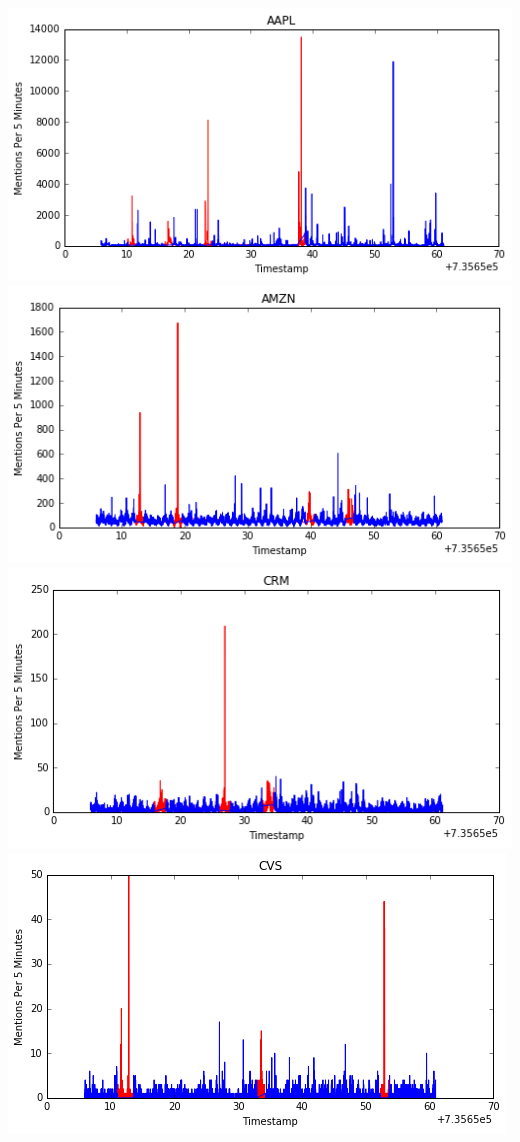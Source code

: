 \documentclass[11pt, margin=1in]{article}
\begin{document}
\begin{center}
\includegraphics[scale=0.4]{img/aapl.png}
\includegraphics[scale=0.4]{img/amzn.png}
\includegraphics[scale=0.4]{img/crm.png}
\includegraphics[scale=0.4]{img/cvs.png}

\end{center}
\end{document}
